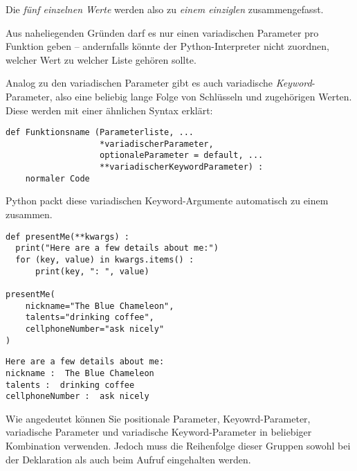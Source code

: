 Die \emph{fünf einzelnen Werte}  werden also zu \emph{einem einziglen}  zusammengefasst.

Aus naheliegenden Gründen darf es nur einen variadischen Parameter pro Funktion geben -- andernfalls könnte der Python-Interpreter nicht zuordnen, welcher Wert zu welcher Liste gehören sollte.

Analog zu den variadischen Parameter gibt es auch variadische \emph{Keyword}-Parameter, also eine beliebig lange Folge von Schlüsseln und zugehörigen Werten. Diese werden mit einer ähnlichen Syntax erklärt:

\begin{codebox}
\begin{verbatim}
def Funktionsname (Parameterliste, ...
                   *variadischerParameter, 
                   optionaleParameter = default, ...
                   **variadischerKeywordParameter) :
    normaler Code
\end{verbatim}
\end{codebox}

Python packt diese variadischen Keyword-Argumente automatisch zu einem  zusammen.

\begin{codebox}
\begin{verbatim}
def presentMe(**kwargs) :
  print("Here are a few details about me:")
  for (key, value) in kwargs.items() :
      print(key, ": ", value)

presentMe(
    nickname="The Blue Chameleon",
    talents="drinking coffee",
    cellphoneNumber="ask nicely"
)
\end{verbatim}
\end{codebox}
\begin{cmdbox}
\begin{verbatim}
Here are a few details about me:
nickname :  The Blue Chameleon
talents :  drinking coffee
cellphoneNumber :  ask nicely
\end{verbatim}
\end{cmdbox}

Wie angedeutet können Sie positionale Parameter, Keyowrd-Parameter, variadische Parameter und variadische Keyword-Parameter in beliebiger Kombination verwenden. Jedoch muss die Reihenfolge dieser Gruppen sowohl bei der Deklaration als auch beim Aufruf eingehalten werden.

